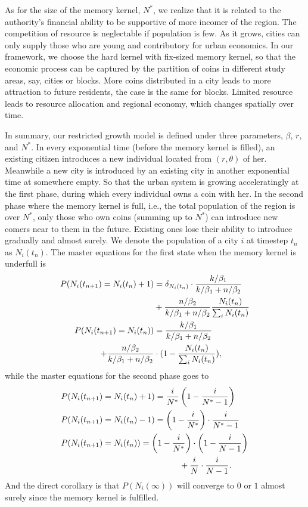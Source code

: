 \documentclass[reprint,unsortedaddress,amsmath,amssymb,aps,prl,fixfloat,showkeys]{revtex4-2}
\begin{document}
As for the size of the memory kernel, $N^*$, we realize that it is related to the authority's financial ability to be supportive of more incomer of the region. The competition of resource is neglectable if population is few. As it grows, cities can only supply those who are young and contributory for urban economics. In our framework, we choose the hard kernel with fix-sized memory kernel, so that the economic process can be captured by the partition of coins in different study areas, say, cities or blocks. More coins distributed in a city leads to more attraction to future residents, the case is the same for blocks. Limited resource leads to resource allocation and regional economy, which changes spatially over time. 

In summary, our restricted growth model is defined under three parameters, $\beta$, $r$, and $N^*$. In every exponential time (before the memory kernel is filled), an existing citizen introduces a new individual located from $(r,\theta)$ of her. Meanwhile a new city is introduced by an existing city in another exponential time at somewhere empty. So that the urban system is growing acceleratingly at the first phase, during which every individual owns a coin with her. In the second phase where the memory kernel is full, i.e., the total population of the region is over $N^*$, only those who own coins (summing up to $N^*$) can introduce new comers near to them in the future. Existing ones lose their ability to introduce gradually and almost surely. We denote the population of a city $i$ at timestep $t_n$ as $N_i(t_n)$. The master equations for the first state when the memory kernel is underfull is 
\begin{align}
    P(N_i(t_{n+1}) = N_i(t_{n})+1) &= \delta_{N_i(t_n)}\cdot\frac{k/\beta_1}{k/\beta_1 + n/\beta_2}\notag \\ &+ \frac{n/\beta_2}{k/\beta_1 + n/\beta_2}\frac{N_i(t_{n})}{\sum_i N_i(t_{n})} \notag \\
    P(N_i(t_{n+1}) = N_i(t_{n})) &= \frac{k/\beta_1}{k/\beta_1 + n/\beta_2}\notag \\ + \frac{n/\beta_2}{k/\beta_1 + n/\beta_2}&\cdot (1-\frac{N_i(t_{n})}{\sum_i N_i(t_{n})}),
\end{align}
while the master equations for the second phase goes to\begin{align}
    &P(N_i(t_{n+1}) = N_i(t_{n})+1)=\frac{i}{N^*}\left(1-\frac{i}{N^*-1}\right)\notag\\
    & P(N_i(t_{n+1}) = N_i(t_{n})-1)=\left(1-\frac{i}{N^*}\right) \cdot \frac{i}{N^*-1}\notag\\
    & P(N_i(t_{n+1}) = N_i(t_{n}))=\left(1-\frac{i}{N^*}\right) \cdot\left(1-\frac{i}{N-1}\right) \notag\\ &\hspace{5cm}+ \frac{i}{N}\cdot\frac{i}{N-1}.
\end{align}
And the direct corollary is that $P(N_i(\infty))$ will converge to $0$ or $1$ almost surely since the memory kernel is fulfilled. 
\end{document}
